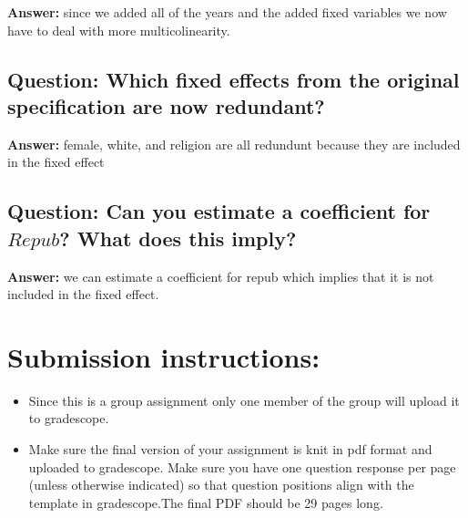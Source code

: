 \documentclass[
]{article}
\begin{document}
\textbf{Answer:} since we added all of the years and the added fixed
variables we now have to deal with more multicolinearity. \clearpage

\hypertarget{question-which-fixed-effects-from-the-original-specification-are-now-redundant}{%
\subsection{Question: Which fixed effects from the original
specification are now
redundant?}\label{question-which-fixed-effects-from-the-original-specification-are-now-redundant}}

\textbf{Answer:} female, white, and religion are all redundunt because
they are included in the fixed effect \clearpage

\hypertarget{question-can-you-estimate-a-coefficient-for-repub-what-does-this-imply}{%
\subsection{\texorpdfstring{Question: Can you estimate a coefficient for
\(Repub\)? What does this
imply?}{Question: Can you estimate a coefficient for Repub? What does this imply?}}\label{question-can-you-estimate-a-coefficient-for-repub-what-does-this-imply}}

\textbf{Answer:} we can estimate a coefficient for repub which implies
that it is not included in the fixed effect.

\hypertarget{submission-instructions}{%
\section{Submission instructions:}\label{submission-instructions}}

\begin{itemize}
\item
  Since this is a group assignment only one member of the group will
  upload it to gradescope.
\item
  Make sure the final version of your assignment is knit in pdf format
  and uploaded to gradescope. Make sure you have one question response
  per page (unless otherwise indicated) so that question positions align
  with the template in gradescope.The final PDF should be 29 pages long.
\end{itemize}
\end{document}
